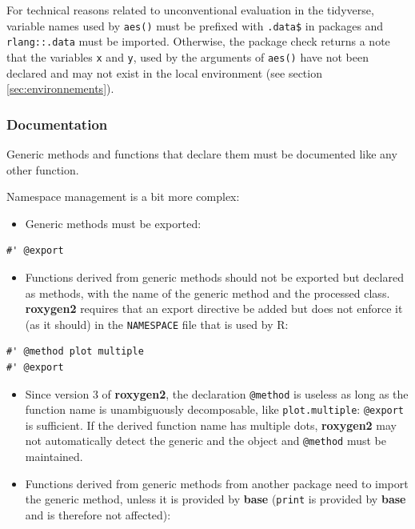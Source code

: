 \documentclass[
  12pt,
  american,
  a4paper,
  extrafontsizes,onecolumn,openright
  ]{memoir}
\providecommand{\tightlist}{%
  \setlength{\itemsep}{0pt}\setlength{\parskip}{0pt}}
\begin{document}
\normalsize

For technical reasons related to unconventional evaluation in the tidyverse, variable names used by \texttt{aes()} must be prefixed with \texttt{.data\$} in packages and \texttt{rlang::.data} must be imported.
Otherwise, the package check returns a note that the variables \texttt{x} and \texttt{y}, used by the arguments of \texttt{aes()} have not been declared and may not exist in the local environment (see section \ref{sec:environnements}).

\subsubsection{Documentation}\label{documentation}

Generic methods and functions that declare them must be documented like any other function.

Namespace management is a bit more complex:

\begin{itemize}
\tightlist
\item
  Generic methods must be exported:
\end{itemize}

\begin{verbatim}
#' @export
\end{verbatim}

\begin{itemize}
\tightlist
\item
  Functions derived from generic methods should not be exported but declared as methods, with the name of the generic method and the processed class.
  \textbf{roxygen2} requires that an export directive be added but does not enforce it (as it should) in the \texttt{NAMESPACE} file that is used by R:
\end{itemize}

\begin{verbatim}
#' @method plot multiple
#' @export
\end{verbatim}

\begin{itemize}
\tightlist
\item
  Since version 3 of \textbf{roxygen2}, the declaration \texttt{@method} is useless as long as the function name is unambiguously decomposable, like \texttt{plot.multiple}: \texttt{@export} is sufficient.
  If the derived function name has multiple dots, \textbf{roxygen2} may not automatically detect the generic and the object and \texttt{@method} must be maintained.
\item
  Functions derived from generic methods from another package need to import the generic method, unless it is provided by \textbf{base} (\texttt{print} is provided by \textbf{base} and is therefore not affected):
\end{itemize}
\end{document}
